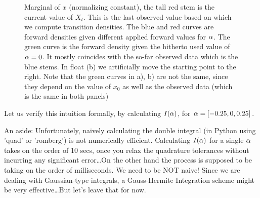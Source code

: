 \documentclass{article}
\begin{document}
\begin{figure}[htp]
\begin{center}
  \caption[labelInTOC]{
  Marginal of $x$ (normalizing constant), the tall red stem
  is the current value of $X_t$. This is the last observed value based on
  which we compute transition densities. The blue and red curves are forward densities
  given different applied forward values for ${\alpha}$. The green curve is the
  forward density given the hitherto used value of ${\alpha}=0$. It mostly coincides
  with the so-far observed data which is the blue stems.
  In float (b) we artificially move the starting point to the right. Note that
  the green curves in a), b) are not the same, since they depend on the value
  of $x_0$ as well as the observed data (which is the same in both panels)}
\end{center}
\end{figure}

Let us verify this intuition formally, by calculating $I({\alpha})$, for ${\alpha} =[-0.25 , 0, 0.25]$.

An aside: Unfortunately, naively calculating the double integral (in Python
using 'quad' or 'romberg') is not numerically efficient. Calculating $I({\alpha})$ for a single
${\alpha}$ takes on the order of 10 secs, once you relax the quadrature
tolerances without incurring any significant error\ldots On the other hand the process is supposed to be taking on the order of milliseconds. We need to be
NOT naive! Since we are dealing with Gaussian-type integrals, a Gauss-Hermite
Integration scheme might be very effective\ldots But let's leave that for now.
\end{document}
